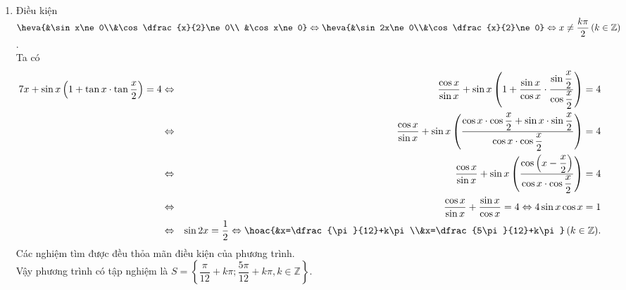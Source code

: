 \begin{ex}
{\begin{enumerate}
\begin{eqnarray*}
			\end{eqnarray*}
			Vậy phương trình có tập  nghiệm là $S=\left\{\dfrac{\pi}{12}+k\pi;\dfrac{\pi}{36}+k\dfrac{\pi}{3}, k\in\mathbb{Z}\right\}$.
			\item Điều kiện $\heva{&\sin x\ne 0\\&\cos\dfrac{x}{2}\ne 0\\ &\cos x\ne 0}\Leftrightarrow\heva{&\sin 2x\ne 0\\&\cos\dfrac{x}{2}\ne  0}\Leftrightarrow x\ne\dfrac{k\pi}{2}\,(k\in\mathbb{Z})$.\\
			Ta có 
			\begin{eqnarray*}
				\cot x+\sin x\left(1+\tan x\cdot \tan\dfrac{x}{2}\right)=4&\Leftrightarrow&\dfrac{\cos x}{\sin x}+\sin x\left(1+\dfrac{\sin x}{\cos x}\cdot  \dfrac{\sin\dfrac{x}{2}}{\cos\dfrac{x}{2}}\right)=4\\
				&\Leftrightarrow&\dfrac{\cos x}{\sin x}+\sin x\left(\dfrac{\cos x\cdot\cos\dfrac{x}{2}+\sin  x\cdot\sin\dfrac{x}{2}}{\cos x\cdot\cos\dfrac{x}{2}}\right)=4\\
				&\Leftrightarrow&\dfrac{\cos x}{\sin x}+\sin x\left(\dfrac{\cos\left(x-\dfrac{x}{2}\right)}{\cos x\cdot\cos\dfrac{x}{2}}\right)=4\\&\Leftrightarrow&\dfrac{\cos  x}{\sin x}+\dfrac{\sin x}{\cos x}=4\Leftrightarrow 4\sin x\cos x=1\\&
				 \Leftrightarrow&\sin 2x=\dfrac{1}{2}\Leftrightarrow\hoac{&x=\dfrac{\pi}{12}+k\pi\\&x=\dfrac{5\pi}{12}+k\pi}\,(k\in\mathbb{Z}).
			\end{eqnarray*}
			Các nghiệm tìm được đều thỏa mãn điều kiện của phương trình.\\ 
			Vậy phương trình có tập nghiệm  là $S=\left\{\dfrac{\pi}{12}+k\pi;\dfrac{5\pi}{12}+k\pi, k\in\mathbb{Z}\right\}$.
		\end{enumerate}
	} 
\end{ex}


